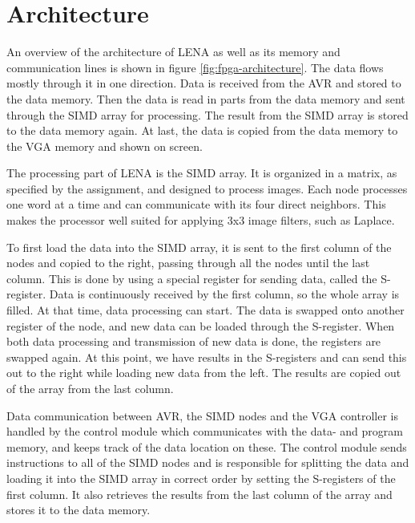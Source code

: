 \section{Architecture}




An overview of the architecture of \ac{LENA} as well as its memory and communication
lines is shown in figure \ref{fig:fpga-architecture}. The data flows mostly
through it in one direction. Data is received from the AVR and stored to the
data memory. Then the data is read in parts from the data memory and sent
through the \ac{SIMD} array for processing. The result from the \ac{SIMD} array is stored
to the data memory again. At last, the data is copied from the data memory to
the \ac{VGA} memory and shown on screen.

The processing part of \ac{LENA} is the \ac{SIMD} array. It is organized in a matrix, as
specified by the assignment, and designed to process images. Each node processes
one word at a time and can communicate with its four direct neighbors. This
makes the processor well suited for applying 3x3 image filters, such as Laplace.

To first load the data into the \ac{SIMD} array, it is sent to the first column of
the nodes and copied to the right, passing through all the nodes until the last
column.  This is done by using a special register for sending data, called the
S-register. Data is continuously received by the first column, so the whole array
is filled. At that time, data processing can start. The data is swapped onto
another register of the node, and new data can be loaded through the S-register.
When both data processing and transmission of new data is done, the registers
are swapped again. At this point, we have results in the S-registers and can
send this out to the right while loading new data from the left. The results are
copied out of the array from the last column.

Data communication between AVR, the \ac{SIMD} nodes and the \ac{VGA}
controller is handled by the control module which communicates with the data-
and program memory, and keeps track of the data location on these. The control
module sends instructions to all of the \ac{SIMD} nodes and is responsible for
splitting the data and loading it into the \ac{SIMD} array in correct order by
setting the S-registers of the first column. It also retrieves the results from
the last column of the array and stores it to the data memory.


